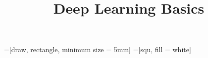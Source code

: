 



=[draw, rectangle, minimum size = 5mm]
=[squ, fill = white]

\newcommand{\titlefigure}{figure/attn.png}
\newcommand{\learninggoals}{
\item Understand attention mechanism
\item Learn the different types of attention}

\title{Deep Learning Basics}
\date{}




